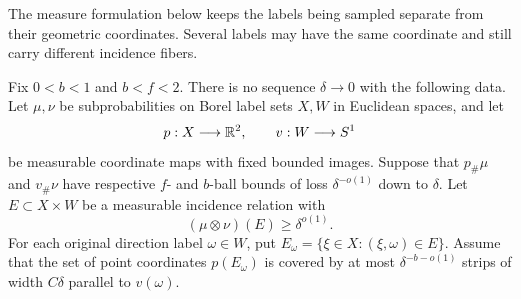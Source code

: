 The measure formulation below keeps the labels being sampled separate
from their geometric coordinates. Several labels may have the same
coordinate and still carry different incidence fibers.

\begin{lemma}
\label{ang:planar-measures}
Fix $0<b<1$ and $b<f<2$. There is no sequence $\delta\to0$ with the
following data. Let $\mu,\nu$ be subprobabilities on Borel label sets
$X,W$ in Euclidean spaces, and let
\[
 p:X\longrightarrow\mathbb R^2,\qquad v:W\longrightarrow S^1
\]
be measurable coordinate maps with fixed bounded images. Suppose that
$p_\#\mu$ and $v_\#\nu$ have respective $f$- and $b$-ball bounds
of loss $\delta^{-o(1)}$ down to $\delta$. Let $E\subset X\times W$ be a measurable
incidence relation with
\[
 (\mu\otimes\nu)(E)\ge\delta^{o(1)}.
\]
For each original direction label $\omega\in W$, put
$E_\omega=\{\xi\in X:(\xi,\omega)\in E\}$. Assume that the set of
point coordinates $p(E_\omega)$ is covered by at most
$\delta^{-b-o(1)}$ strips of width $C\delta$ parallel to $v(\omega)$.
\end{lemma}

